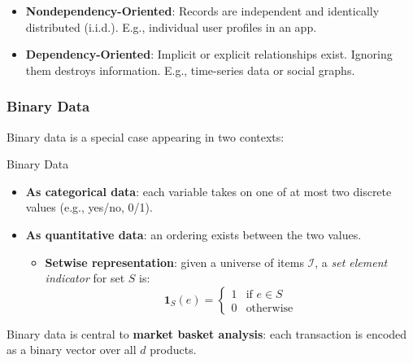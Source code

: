 \documentclass[11pt]{article}
\theoremstyle{smallexample}
\begin{document}
\begin{itemize}
    \item \textbf{Nondependency-Oriented}: Records are independent and identically distributed (i.i.d.). E.g., individual user profiles in an app.
    \item \textbf{Dependency-Oriented}: Implicit or explicit relationships exist. Ignoring them destroys information. E.g., time-series data or social graphs.
\end{itemize}

\subsubsection{Binary Data}

Binary data is a special case appearing in two contexts:

\begin{defbox}{Binary Data}
    \begin{itemize}
    \item \textbf{As categorical data}: each variable takes on one of at most two discrete
    values (e.g., yes/no, 0/1). 
    \item \textbf{As quantitative data}: an ordering exists between the two values.
    \begin{itemize}[label=$\cdot$]
    \item  \textbf{Setwise representation}: given a universe of items $\mathcal{I}$, a
    \textit{set element indicator} for set $S$ is:
    \[
        \mathbf{1}_S(e) =
        \begin{cases}
            1 & \text{if } e \in S \\
            0 & \text{otherwise}
        \end{cases}
    \]
    \end{itemize}
    \end{itemize}
\end{defbox}

Binary data is central to \textbf{market basket analysis}: each transaction is
encoded as a binary vector over all $d$ products.
\end{document}
